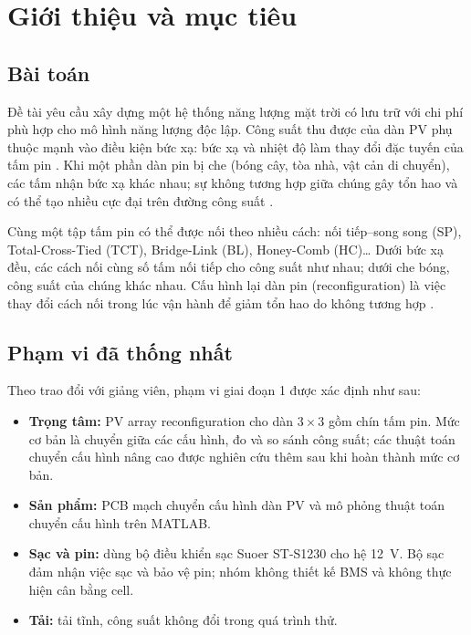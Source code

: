 \section{Giới thiệu và mục tiêu}

\subsection{Bài toán}

Đề tài yêu cầu xây dựng một hệ thống năng lượng mặt trời có lưu trữ với chi phí phù hợp cho mô hình năng lượng độc lập. Công suất thu được của dàn PV phụ thuộc mạnh vào điều kiện bức xạ: bức xạ và nhiệt độ làm thay đổi đặc tuyến của tấm pin \cite{yaqoob}. Khi một phần dàn pin bị che (bóng cây, tòa nhà, vật cản di chuyển), các tấm nhận bức xạ khác nhau; sự không tương hợp giữa chúng gây tổn hao và có thể tạo nhiều cực đại trên đường công suất \cite{thanh}.

Cùng một tập tấm pin có thể được nối theo nhiều cách: nối tiếp--song song (SP), Total-Cross-Tied (TCT), Bridge-Link (BL), Honey-Comb (HC)\dots{} Dưới bức xạ đều, các cách nối cùng số tấm nối tiếp cho công suất như nhau; dưới che bóng, công suất của chúng khác nhau. Cấu hình lại dàn pin (reconfiguration) là việc thay đổi cách nối trong lúc vận hành để giảm tổn hao do không tương hợp \cite{thanh}.

\subsection{Phạm vi đã thống nhất}
\label{sec:proposal-scope}

Theo trao đổi với giảng viên, phạm vi giai đoạn 1 được xác định như sau:

\begin{itemize}
    \item \textbf{Trọng tâm:} PV array reconfiguration cho dàn \(3\times3\) gồm chín tấm pin. Mức cơ bản là chuyển giữa các cấu hình, đo và so sánh công suất; các thuật toán chuyển cấu hình nâng cao được nghiên cứu thêm sau khi hoàn thành mức cơ bản.
    \item \textbf{Sản phẩm:} PCB mạch chuyển cấu hình dàn PV và mô phỏng thuật toán chuyển cấu hình trên MATLAB.
    \item \textbf{Sạc và pin:} dùng bộ điều khiển sạc Suoer ST-S1230 cho hệ 12~V. Bộ sạc đảm nhận việc sạc và bảo vệ pin; nhóm không thiết kế BMS và không thực hiện cân bằng cell.
    \item \textbf{Tải:} tải tĩnh, công suất không đổi trong quá trình thử.
\end{itemize}

